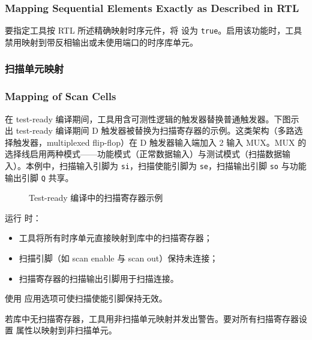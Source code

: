 \subsubsection*{Mapping Sequential Elements Exactly as Described in RTL}

要指定工具按 RTL 所述精确映射时序元件，将  设为 \texttt{true}。启用该功能时，工具禁用映射到带反相输出或未使用端口的时序库单元。

\subsubsection{扫描单元映射}
\subsubsection*{Mapping of Scan Cells}

在 test-ready 编译期间，工具用含可测性逻辑的触发器替换普通触发器。下图示出 test-ready 编译期间 D 触发器被替换为扫描寄存器的示例。这类架构（多路选择触发器，multiplexed flip-flop）在 D 触发器输入端加入 2 输入 MUX。MUX 的选择线启用两种模式——功能模式（正常数据输入）与测试模式（扫描数据输入）。本例中，扫描输入引脚为 \texttt{si}，扫描使能引脚为 \texttt{se}，扫描输出引脚 \texttt{so} 与功能输出引脚 \texttt{Q} 共享。

\begin{figure}[htbp]
\centering
{}
\caption{Test-ready 编译中的扫描寄存器示例}
\label{fig:scan-mux-ff}
\end{figure}

运行  时：
\begin{itemize}
  \item 工具将所有时序单元直接映射到库中的扫描寄存器；
  \item 扫描引脚（如 scan enable 与 scan out）保持未连接；
  \item 扫描寄存器的扫描输出引脚用于扫描连接。
\end{itemize}

使用  应用选项可使扫描使能引脚保持无效。

若库中无扫描寄存器，工具用非扫描单元映射并发出警告。要对所有扫描寄存器设置  属性以映射到非扫描单元。

